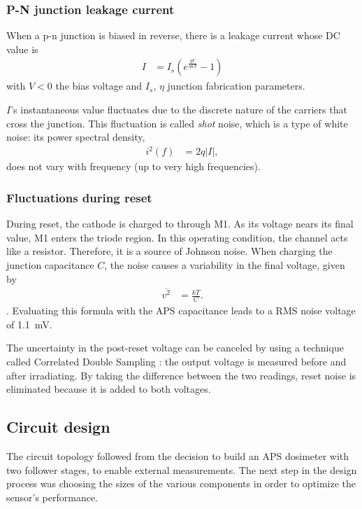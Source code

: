 \subsubsection{P-N junction leakage current}
When a p-n junction is biased in reverse,
there is a leakage current
\cite{sze_physics_2007}
whose DC value is
\begin{align*}
    I&=I_s(e^{\frac{qV}{\eta kT}}-1)
\end{align*}
with $V<0$ the bias voltage and $I_s$, $\eta$ junction fabrication parameters.

$I$'s instantaneous value fluctuates due to the discrete nature of the carriers
that cross the junction.
This fluctuation is called \emph{shot} noise, which is a type of white noise:
its power spectral density,
\begin{align*}
    i^2(f) &= 2q|I|,
\end{align*}
does not vary with frequency (up to very high frequencies).
\subsubsection{Fluctuations during reset}
During reset, the cathode is charged to \vdd through M1.
As its voltage nears its final value, M1 enters the triode region.
In this operating condition, the channel acts like a resistor.
Therefore, it is a source of Johnson noise\cite{baker_cmos_2010}.
When charging the junction capacitance $C$,
the noise causes a variability in the final voltage, given by
\begin{align*}
    \overline{v^2} &= \frac{kT}C.
\end{align*}
. Evaluating this formula with the APS capacitance
leads to a RMS noise voltage of \SI{1.1}{\milli\volt}.

The uncertainty in the post-reset voltage can be canceled by using
a technique called Correlated Double Sampling
\cite{white_characterization_1974}:
the output voltage is measured before and after irradiating.
By taking the difference between the two readings,
reset noise is eliminated because it is added to both voltages.

\subsection{Circuit design}
\label{section:diseno_aps}
The circuit topology followed from the decision to build an APS dosimeter
with two follower stages, to enable external measurements.
The next step in the design process was choosing the sizes of the various components
in order to optimize the sensor's performance.

